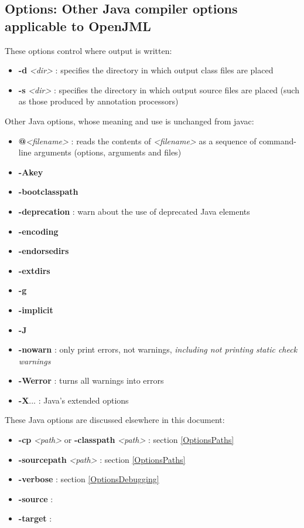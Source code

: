 \subsection{Options: Other Java compiler options applicable to OpenJML}

These options control where output is written:
\begin{itemize}
\item \textbf{-d} {\it <dir>} : specifies the directory in which output class files are placed
\item \textbf{-s} {\it <dir>} : specifies the directory in which output source files are placed (such as those produced by annotation processors)
\end{itemize}

Other Java options, whose meaning and use is unchanged from javac:
\begin{itemize}
\item \textbf{@}\textit{<filename>} : reads the contents of \textit{<filename>} as a sequence of command-line arguments (options, arguments and files)
\item \textbf{-Akey}
\item \textbf{-bootclasspath}
\item \textbf{-deprecation} : warn about the use of deprecated Java elements
\item \textbf{-encoding}
\item \textbf{-endorsedirs}
\item \textbf{-extdirs}
\item \textbf{-g}
\item \textbf{-implicit}
\item \textbf{-J}
\item \textbf{-nowarn} : only print errors, not warnings, \textit{including not printing static check warnings}
\item \textbf{-Werror} : turns all warnings into errors
\item \textbf{-X}... : Java's extended options
\end{itemize}

These Java options are discussed elsewhere in this document:
\begin{itemize}
\item \textbf{-cp} \textit{<path>} or \textbf{-classpath} \textit{<path>} : section \ref{OptionsPaths}
\item \textbf{-sourcepath} \textit{<path>} : section \ref{OptionsPaths}
\item \textbf{-verbose} : section \ref{OptionsDebugging}
\item \textbf{-source} :  
\item \textbf{-target} :  
\end{itemize}


